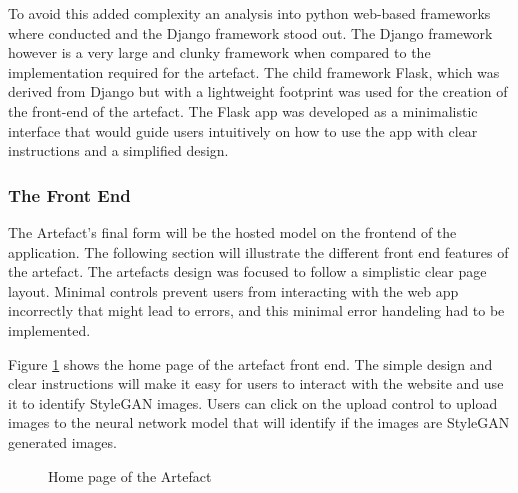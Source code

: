 To avoid this added complexity an analysis into python web-based frameworks where conducted and the Django framework stood out. The Django framework however is a very large and clunky framework when compared to the implementation required for the artefact. The child framework Flask, which was derived from Django but with a lightweight footprint was used for the creation of the front-end of the artefact. The Flask app was developed as a minimalistic interface that would guide users intuitively on how to use the app with clear instructions and a simplified design. 

\subsubsection{The Front End}

The Artefact's final form will be the hosted model on the frontend of the application. The following section will illustrate the different front end features of the artefact. The artefacts design was focused to follow a simplistic clear page layout. Minimal controls prevent users from interacting with the web app incorrectly that might lead to errors, and this minimal error handeling had to be implemented.

Figure \ref{fig:home} shows the home page of the artefact front end. The simple design and clear instructions will make it easy for users to interact with the website and use it to identify StyleGAN images. Users can click on the upload control to upload images to the neural network model that will identify if the images are StyleGAN generated images. 

\begin{figure}[H]%
\centering
{}%
\caption{Home page of the Artefact}%
\label{fig:home}%
\end{figure}

